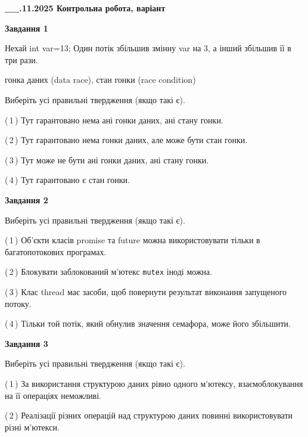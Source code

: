 \documentclass[12pt, ukrainian]{article}
\def\code#1{\Verb!#1!}
\begin{document}
\begin {large}

\textbf{\_\_.11.2025 Контрольна робота, варіант  }\par


{

\begin{center}
\textbf{Завдання 1}
\end{center}
Нехай int var=13; Один потік збільшив змінну var на 3, а інший збільшив її в три рази.

гонка даних (data race), стан гонки (race condition)

Виберіть усі правильні твердження (якщо такі є).\par
\vspace{2mm}
(\,1\,) Тут гарантовано нема ані гонки даних, ані стану гонки.%

(\,2\,) Тут гарантовано нема гонки даних, але може бути стан гонки.%

(\,3\,) Тут може не бути ані гонки даних, ані стану гонки.%

(\,4\,) Тут гарантовано є стан гонки.%



\begin{center}
\textbf{Завдання 2}
\end{center}
Виберіть усі правильні твердження (якщо такі є).\par
\vspace{2mm}

(\,1\,) Об’єкти класів promise та future можна використовувати тільки в багатопотокових програмах.%

(\,2\,) Блокувати заблокований м’ютекс  \code{mutex} іноді можна.%

(\,3\,) Клас thread має засоби, щоб повернути результат виконання запущеного потоку.%

(\,4\,) Тільки той потік, який обнулив значення семафора, може його збільшити.%



\begin{center}
\textbf{Завдання 3}
\end{center}
Виберіть усі правильні твердження (якщо такі є).\par
\vspace{2mm}

(\,1\,) За використання структурою даних рівно одного м’ютексу, взаємоблокування на її операціях неможливі.%

(\,2\,) Реалізації різних операцій над структурою даних повинні використовувати різні м’ютекси.%

}
\end{large}
\end{document}
